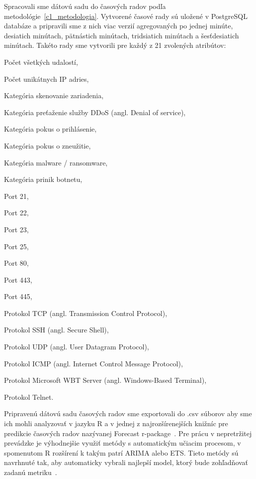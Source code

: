 \documentclass[thesismargins, thesislinespacing, openright, upjsfrontpage, combineabstracts]{rnthesis}
\begin{document}
Spracovali sme dátovú sadu do časových radov podľa metodológie~\ref{c1_metodologia}. Vytvorené časové rady sú uložené v PostgreSQL databáze a pripravili sme z nich viac verzií agregovaných po jednej minúte, desiatich minútach, pätnástich minútach, tridsiatich minútach a šesťdesiatich minútach. Takéto rady sme vytvorili pre každý z 21 zvolených atribútov:
\begin{compactenum}
    \item Počet všetkých udalostí,
    \item Počet unikátnych IP adries,
    \item Kategória skenovanie zariadenia,
    \item Kategória preťaženie služby DDoS (angl. Denial of service),
    \item Kategória pokus o prihlásenie,
    \item Kategória pokus o zneužitie,
    \item Kategória malware / ransomware,
    \item Kategória prinik botnetu,
    \item Port 21,
    \item Port 22,
    \item Port 23,
    \item Port 25,
    \item Port 80,
    \item Port 443,
    \item Port 445,
    \item Protokol TCP (angl. Transmission Control Protocol),
    \item Protokol SSH (angl. Secure Shell),
    \item Protokol UDP (angl. User Datagram Protocol),
    \item Protokol ICMP (angl. Internet Control Message Protocol),
    \item Protokol Microsoft WBT Server (angl. Windows-Based Terminal),
    \item Protokol Telnet.
\end{compactenum}

Pripravenú dátovú sadu časových radov sme exportovali do .csv súborov aby sme ich mohli analyzovať v jazyku R a v jednej z najrozšírenejších knižníc pre predikcie časových radov nazývanej Forecast r-package~\cite{hyndman2007automatic}. Pre prácu v nepretržitej prevádzke je výhodnejšie využiť metódy s automatickým učiacim procesom, v spomenutom R rozšírení k takým patrí ARIMA alebo ETS. Tieto metódy sú navrhnuté tak, aby automaticky vybrali najlepší model, ktorý bude zohľadňovať zadanú metriku~\cite{hyndman2007automatic}.
\end{document}
